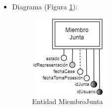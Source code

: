 \begin{itemize}
\begin{itemize}
        \item fechaTomaPosesión
        \begin{itemize}
            \item Definición: fecha de toma de posesión del miembro de gobierno.
            \item Dominio: 01/01/1970 hasta 31/12/9999.
            \item Tipo: atributo simple.
            \item Opcional: no
            \item Ejemplo: 10/09/2023
        \end{itemize}

        \item fechaCese
        \begin{itemize}
            \item Definición: fecha de cese del miembro de gobierno.
            \item Dominio: 01/01/1970 hasta 31/12/9999.
            \item Tipo: atributo simple.
            \item Opcional: sí
            \item Ejemplo: 10/09/2023
        \end{itemize}

        \item estado
        \begin{itemize}
            \item Definición: estado del miembro de la junta.
            \item Dominio: 1 (Habilitado), 0 (Deshabilitado).
            \item Tipo: atributo simple.
            \item Opcional: no
            \item Ejemplo: 1
        \end{itemize}
    \end{itemize}

    \item Diagrama (Figura \ref{fig:E-MiembroJunta}):

    \begin{figure}[H]
        \centering
        \includegraphics[scale=0.8]{img/diagramas/EER/E-MiembroJunta.png}
        \caption{Entidad MiembroJunta}
        \label{fig:E-MiembroJunta}
    \end{figure}


\end{itemize}
